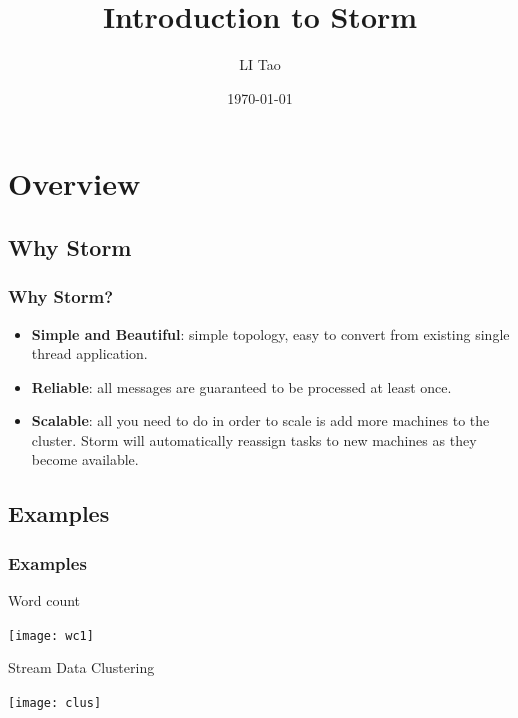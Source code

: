 \documentclass{beamer}
\title[Storm]{Introduction to Storm} %
\author{LI Tao} %
\institute[HKUST] %
{
Hong Kong University of Science and Technology \\ %
\medskip
\textit{tliab@ust.hk} %
}
\date{\today} %
\begin{document}
\begin{frame}
\titlepage %
\end{frame}

\begin{frame}
\tableofcontents %
\end{frame}

\section{Overview}
\subsection{Why Storm}
\begin{frame}
    \frametitle{Why Storm?}
    \begin{itemize}
        \item \textbf{Simple and Beautiful}: simple topology, easy to convert from
            existing single thread application.
        \item \textbf{Reliable}: all messages are guaranteed to be processed at
            least once.
        \item \textbf{Scalable}: all you need to do in order to scale is add more
            machines to the cluster. Storm will automatically reassign
            tasks to new machines as they become available.
    \end{itemize}
\end{frame}


\subsection{Examples}
\begin{frame}
    \frametitle{Examples}
    Word count

    \texttt{[image: wc1]}

    Stream Data Clustering

    \texttt{[image: clus]}
\end{frame}
\end{document}
